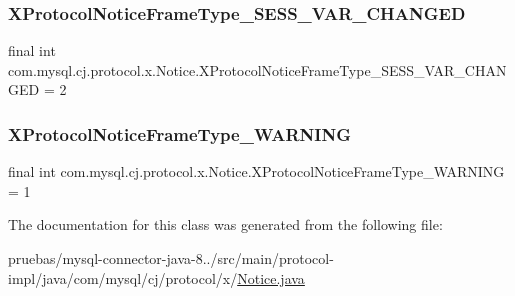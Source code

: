 \subsubsection{\texorpdfstring{X\+Protocol\+Notice\+Frame\+Type\+\_\+\+S\+E\+S\+S\+\_\+\+V\+A\+R\+\_\+\+C\+H\+A\+N\+G\+ED}{XProtocolNoticeFrameType\_SESS\_VAR\_CHANGED}}
{\footnotesize\ttfamily final int com.\+mysql.\+cj.\+protocol.\+x.\+Notice.\+X\+Protocol\+Notice\+Frame\+Type\+\_\+\+S\+E\+S\+S\+\_\+\+V\+A\+R\+\_\+\+C\+H\+A\+N\+G\+ED = 2\hspace{0.3cm}{\ttfamily [static]}}

\mbox{\label{classcom_1_1mysql_1_1cj_1_1protocol_1_1x_1_1_notice_a9b6f1846f75fe7b30c9f3d976a3036fd}} 
\subsubsection{\texorpdfstring{X\+Protocol\+Notice\+Frame\+Type\+\_\+\+W\+A\+R\+N\+I\+NG}{XProtocolNoticeFrameType\_WARNING}}
{\footnotesize\ttfamily final int com.\+mysql.\+cj.\+protocol.\+x.\+Notice.\+X\+Protocol\+Notice\+Frame\+Type\+\_\+\+W\+A\+R\+N\+I\+NG = 1\hspace{0.3cm}{\ttfamily [static]}}



The documentation for this class was generated from the following file\+:\begin{DoxyCompactItemize}
\item 
pruebas/mysql-\/connector-\/java-\/8../src/main/protocol-\/impl/java/com/mysql/cj/protocol/x/\mbox{\hyperlink{_notice_8java}{Notice.\+java}}\end{DoxyCompactItemize}
